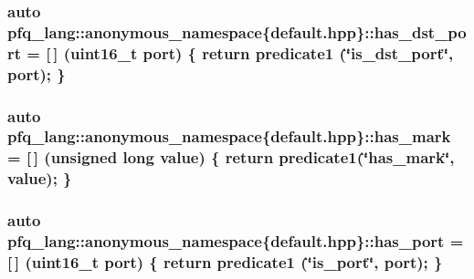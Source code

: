 \hypertarget{namespacepfq__lang_1_1anonymous__namespace_02default_8hpp_03_accc3aed36db0c762dd6c95f3706c8741}{
\subsubsection[{has\+\_\+dst\+\_\+port}]{\setlength{\rightskip}{0pt plus 5cm}auto pfq\+\_\+lang\+::anonymous\+\_\+namespace\{default.\+hpp\}\+::has\+\_\+dst\+\_\+port = \mbox{[}$\,$\mbox{]} (uint16\+\_\+t {\bf port}) \{ return {\bf predicate1} (\char`\"{}is\+\_\+dst\+\_\+port\char`\"{}, port); \}}}\label{namespacepfq__lang_1_1anonymous__namespace_02default_8hpp_03_accc3aed36db0c762dd6c95f3706c8741}
\hypertarget{namespacepfq__lang_1_1anonymous__namespace_02default_8hpp_03_a0f9dc3f39bf9793e766b6312718483f1}{
\subsubsection[{has\+\_\+mark}]{\setlength{\rightskip}{0pt plus 5cm}auto pfq\+\_\+lang\+::anonymous\+\_\+namespace\{default.\+hpp\}\+::has\+\_\+mark = \mbox{[}$\,$\mbox{]} (unsigned long value) \{ return {\bf predicate1}(\char`\"{}has\+\_\+mark\char`\"{}, value); \}}}\label{namespacepfq__lang_1_1anonymous__namespace_02default_8hpp_03_a0f9dc3f39bf9793e766b6312718483f1}
\hypertarget{namespacepfq__lang_1_1anonymous__namespace_02default_8hpp_03_ad2840696177c5f4f6f2072bcaae7407e}{
\subsubsection[{has\+\_\+port}]{\setlength{\rightskip}{0pt plus 5cm}auto pfq\+\_\+lang\+::anonymous\+\_\+namespace\{default.\+hpp\}\+::has\+\_\+port = \mbox{[}$\,$\mbox{]} (uint16\+\_\+t {\bf port}) \{ return {\bf predicate1} (\char`\"{}is\+\_\+port\char`\"{}, port); \}}}\label{namespacepfq__lang_1_1anonymous__namespace_02default_8hpp_03_ad2840696177c5f4f6f2072bcaae7407e}
